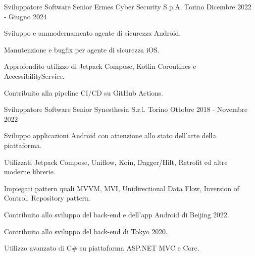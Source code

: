 

\begin{cventries}

  \cventry
    {Sviluppatore Software Senior} %
    {Ermes Cyber Security S.p.A.} %
    {Torino} %
    {Dicembre 2022 - Giugno 2024} %
    {
      \begin{cvitems} %
        \item {Sviluppo e ammodernamento agente di sicurezza Android.}
        \item {Manutenzione e bugfix per agente di sicurezza iOS.}
        \item {Approfondito utilizzo di Jetpack Compose, Kotlin Coroutines e AccessibilityService.}
        \item {Contribuito alla pipeline CI/CD su GitHub Actions.}
      \end{cvitems}
    }

  \cventry
    {Sviluppatore Software Senior} %
    {Synesthesia S.r.l.} %
    {Torino} %
    {Ottobre 2018 - Novembre 2022} %
    {
      \begin{cvitems} %
        \item {Sviluppo applicazioni Android con attenzione allo stato dell'arte della piattaforma.}
        \item {Utilizzati Jetpack Compose, Uniflow, Koin, Dagger/Hilt, Retrofit ed altre moderne librerie.}
        \item {Impiegati pattern quali MVVM, MVI, Unidirectional Data Flow, Inversion of Control, Repository pattern.}
        \item {Contribuito allo sviluppo del back-end e dell'app Android di Beijing 2022.}
        \item {Contribuito allo sviluppo del back-end di Tokyo 2020.}
        \item {Utilizzo avanzato di C\# su piattaforma ASP.NET MVC e Core.}
      \end{cvitems}
    }


\end{cventries}
